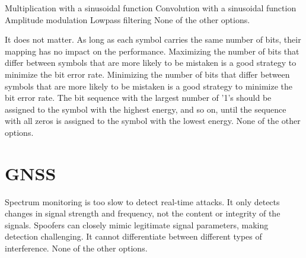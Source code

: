 \begin{questions}
    \begin{checkboxes}
        \CorrectChoice Multiplication with a sinusoidal function
        \choice Convolution with a sinusoidal function
        \choice Amplitude modulation
        \choice Lowpass filtering
        \choice None of the other options.
    \end{checkboxes}

    \begin{checkboxes}
        \choice It does not matter. As long as each symbol carries the same number of bits, their mapping has no impact on the performance.
        \choice Maximizing the number of bits that differ between symbols that are more likely to be mistaken is a good strategy to minimize the bit error rate.
        \CorrectChoice Minimizing the number of bits that differ between symbols that are more likely to be mistaken is a good strategy to minimize the bit error rate.
        \choice The bit sequence with the largest number of '1's should be assigned to the symbol with the highest energy, and so on, until the sequence with all zeros is assigned to the symbol with the lowest energy.
        \choice None of the other options.
    \end{checkboxes}

    \section{GNSS}

    \begin{checkboxes}
        \choice Spectrum monitoring is too slow to detect real-time attacks.
        \CorrectChoice It only detects changes in signal strength and frequency, not the content or integrity of the signals.
        \CorrectChoice Spoofers can closely mimic legitimate signal parameters, making detection challenging.
        \choice It cannot differentiate between different types of interference.
        \choice None of the other options.
    \end{checkboxes}



\end{questions}
